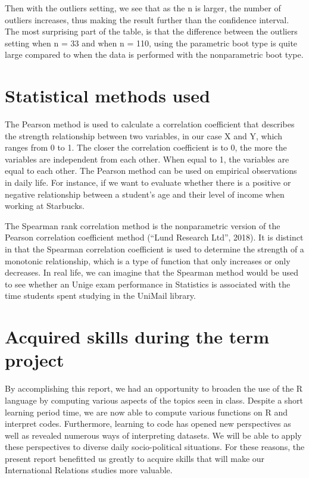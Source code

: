 \documentclass[11pt,]{article}
\begin{document}
Then with the outliers setting, we see that as the n is larger, the
number of outliers increases, thus making the result further than the
confidence interval. The most surprising part of the table, is that the
difference between the outliers setting when n = 33 and when n = 110,
using the parametric boot type is quite large compared to when the data
is performed with the nonparametric boot type.

\hypertarget{statistical-methods-used}{%
\section{Statistical methods used}\label{statistical-methods-used}}

The Pearson method is used to calculate a correlation coefficient that
describes the strength relationship between two variables, in our case X
and Y, which ranges from 0 to 1. The closer the correlation coefficient
is to 0, the more the variables are independent from each other. When
equal to 1, the variables are equal to each other. The Pearson method
can be used on empirical observations in daily life. For instance, if we
want to evaluate whether there is a positive or negative relationship
between a student's age and their level of income when working at
Starbucks.

The Spearman rank correlation method is the nonparametric version of the
Pearson correlation coefficient method (``Lund Research Ltd'', 2018). It
is distinct in that the Spearman correlation coefficient is used to
determine the strength of a monotonic relationship, which is a type of
function that only increases or only decreases. In real life, we can
imagine that the Spearman method would be used to see whether an Unige
exam performance in Statistics is associated with the time students
spent studying in the UniMail library.

\hypertarget{acquired-skills-during-the-term-project}{%
\section{Acquired skills during the term
project}\label{acquired-skills-during-the-term-project}}

By accomplishing this report, we had an opportunity to broaden the use
of the R language by computing various aspects of the topics seen in
class. Despite a short learning period time, we are now able to compute
various functions on R and interpret codes. Furthermore, learning to
code has opened new perspectives as well as revealed numerous ways of
interpreting datasets. We will be able to apply these perspectives to
diverse daily socio-political situations. For these reasons, the present
report benefitted us greatly to acquire skills that will make our
International Relations studies more valuable.
\end{document}
